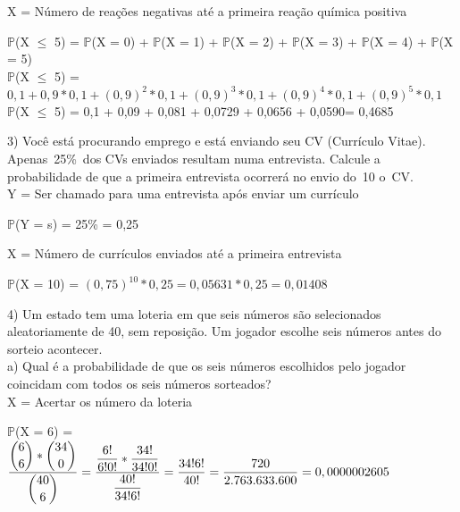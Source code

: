 \documentclass[12pt,a4paper,draft]{article}
\begin{document}
	X = Número de reações negativas até a primeira reação química positiva
	\begin{center}
		\vspace{0.5cm}
		$\mathbb{P}$(X $\leq$ 5) = $\mathbb{P}$(X = 0) + $\mathbb{P}$(X = 1) + $\mathbb{P}$(X = 2) + $\mathbb{P}$(X = 3) + $\mathbb{P}$(X = 4) + $\mathbb{P}$(X = 5)
		\vspace{0.5cm}\\
		$\mathbb{P}$(X $\leq$ 5) = $0,1 + 0,9 * 0,1 + \left(0,9\right)^2 * 0,1 + \left(0,9\right)^3 * 0,1 + \left(0,9\right)^4 * 0,1 + \left(0,9\right)^5 * 0,1$ 
		\vspace{0.5cm}\\
		$\mathbb{P}$(X $\leq$ 5) = 0,1 + 0,09 + 0,081 + 0,0729 + 0,0656 + 0,0590= 0,4685
	\end{center}
\vspace{1cm}
	3) Você está procurando emprego e está enviando seu CV (Currículo Vitae).	Apenas 25\% dos CVs enviados resultam numa entrevista. Calcule a probabilidade de que a primeira entrevista ocorrerá no envio do 10 o CV.
	\vspace{0.5cm}\\
	Y = Ser chamado para uma entrevista após enviar um currículo
	\begin{center}
		\vspace{0.5cm}
		$\mathbb{P}$(Y = s) = 25\% = 0,25
	\end{center}
	\vspace{1cm}
	X = Número de currículos enviados até a primeira entrevista
	\begin{center}
		\vspace{0.5cm}
		$\mathbb{P}$(X = 10) = $\left(0,75\right)^10 * 0,25 = 0,05631 * 0,25 = 0,01408$ 
	\end{center}
	\vspace{1cm}
	4) Um estado tem uma loteria em que seis números são selecionados
	aleatoriamente de 40, sem reposição. Um jogador escolhe seis números antes do sorteio acontecer.\\
	a) Qual é a probabilidade de que os seis números escolhidos pelo jogador coincidam com todos os seis números sorteados?
	\vspace{0.5cm}\\
	X = Acertar os número da loteria
	\begin{center}
		\vspace{0.5cm}
		$\mathbb{P}$(X = 6) = $\dfrac{\dbinom{6}{6} * \dbinom{34}{0}}{\dbinom{40}{6}} = \dfrac{\dfrac{6!}{6!0!} * \dfrac{34!}{34!0!}}{\dfrac{40!}{34! 6!}} = \dfrac{34!6!}{40!} = \dfrac{720}{2.763.633.600} = 0,0000002605$
	\end{center}
\end{document}
